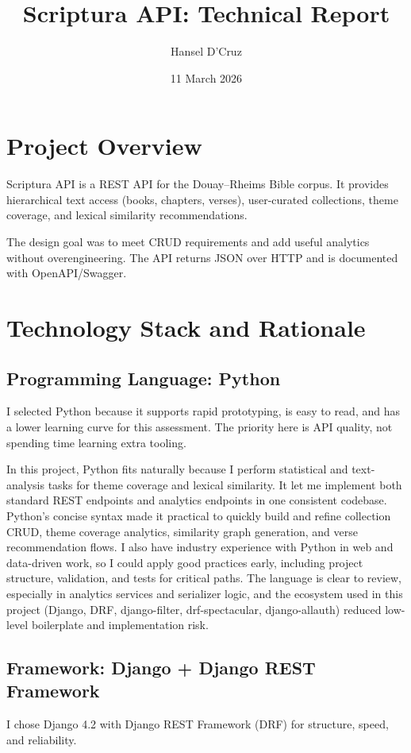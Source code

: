 \documentclass[11pt,a4paper]{article}
\title{Scriptura API: Technical Report}
\author{Hansel D'Cruz}
\date{11 March 2026}
\begin{document}
\maketitle

\section{Project Overview}
Scriptura API is a REST API for the Douay--Rheims Bible corpus. It provides hierarchical text access (books, chapters, verses), user-curated collections, theme coverage, and lexical similarity recommendations.

The design goal was to meet CRUD requirements and add useful analytics without overengineering. The API returns JSON over HTTP and is documented with OpenAPI/Swagger.

\section{Technology Stack and Rationale}
\subsection{Programming Language: Python}
I selected Python because it supports rapid prototyping, is easy to read, and has a lower learning curve for this assessment. The priority here is API quality, not spending time learning extra tooling.

In this project, Python fits naturally because I perform statistical and text-analysis tasks for theme coverage and lexical similarity. It let me implement both standard REST endpoints and analytics endpoints in one consistent codebase. Python's concise syntax made it practical to quickly build and refine collection CRUD, theme coverage analytics, similarity graph generation, and verse recommendation flows. I also have industry experience with Python in web and data-driven work, so I could apply good practices early, including project structure, validation, and tests for critical paths. The language is clear to review, especially in analytics services and serializer logic, and the ecosystem used in this project (Django, DRF, django-filter, drf-spectacular, django-allauth) reduced low-level boilerplate and implementation risk.

\subsection{Framework: Django + Django REST Framework}
I chose Django 4.2 with Django REST Framework (DRF) for structure, speed, and reliability.
\end{document}
